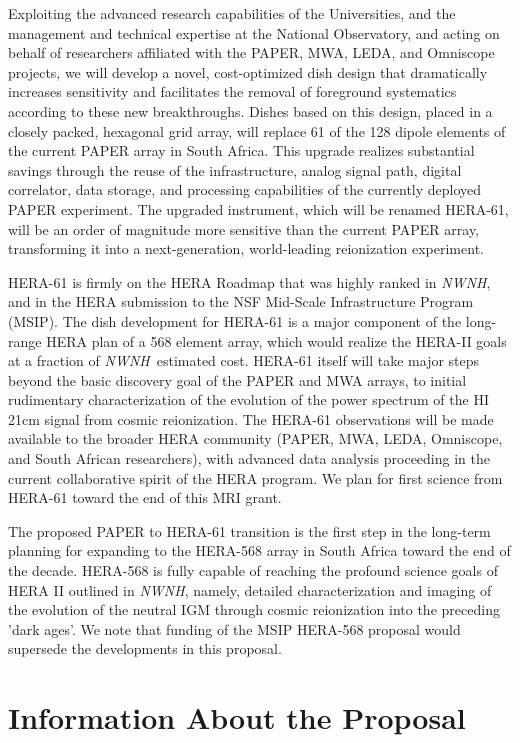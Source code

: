 \documentclass[preprint]{aastex}
\def\nwnh{{\sl NWNH}}
\begin{document}
Exploiting the advanced research capabilities of the Universities, and
the management and technical expertise at the National Observatory,
and acting on behalf of researchers affiliated with the PAPER, MWA,
LEDA, and Omniscope projects, we will develop a novel, cost-optimized
dish design that dramatically increases sensitivity and facilitates
the removal of foreground systematics according to these new
breakthroughs. Dishes based on this design, placed in a closely
packed, hexagonal grid array, will replace 61 of the 128 dipole
elements of the current PAPER array in South Africa.  This upgrade
realizes substantial savings through the reuse of the infrastructure,
analog signal path, digital correlator, data storage, and processing
capabilities of the currently deployed PAPER experiment.  The upgraded
instrument, which will be renamed HERA-61, will be an order of
magnitude more sensitive than the current PAPER array, transforming
it into a next-generation, world-leading reionization experiment.  

HERA-61 is firmly on the HERA Roadmap that was highly ranked in \nwnh,
and in the HERA submission to the NSF Mid-Scale Infrastructure Program
(MSIP). The dish development for HERA-61 is a major component of the
long-range HERA plan of a 568 element array, which would realize the HERA-II goals at a fraction of \nwnh\ estimated cost.  HERA-61 itself will take
major steps beyond the basic discovery goal of the PAPER and MWA
arrays, to initial rudimentary characterization of the evolution of
the power spectrum of the HI 21cm signal from cosmic reionization.
The HERA-61 observations will be made available to the broader HERA
community (PAPER, MWA, LEDA, Omniscope, and South African
researchers), with advanced data analysis proceeding in the current
collaborative spirit of the HERA program. We plan for first science
from HERA-61 toward the end of this MRI grant.

The proposed PAPER to HERA-61 transition is the first step in the
long-term planning for expanding to the HERA-568 array in South Africa
toward the end of the decade. HERA-568 is fully capable of reaching
the profound science goals of HERA II outlined in \nwnh, namely,
detailed characterization and imaging of the evolution of the neutral
IGM through cosmic reionization into the preceding 'dark ages'. We
note that funding of the MSIP HERA-568 proposal would supersede the
developments in this proposal.


\vspace{-0.25in}
\section{Information About the Proposal}
\vspace{-0.20in}
\end{document}
